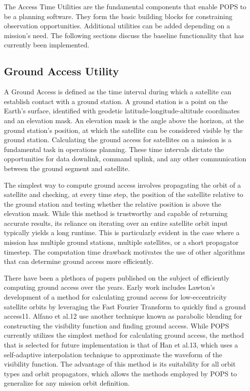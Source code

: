 The Access Time Utilities are the fundamental components that enable POPS to be
a planning software. They form the basic building blocks for constraining
observation opportunities. Additional utilities can be added depending on a
mission’s need. The following sections discuss the baseline functionality that
has currently been implemented.


\subsection{Ground Access Utility}

A Ground Access is defined as the time interval during which a satellite can
establish contact with a ground station. A ground station is a point on the
Earth’s surface, identified with geodetic latitude-longitude-altitude
coordinates and an elevation mask. An elevation mask is the angle above the
horizon, at the ground station’s position, at which the satellite can be
considered visible by the ground station. Calculating the ground access for
satellites on a mission is a fundamental task in operations planning. These
time intervals dictate the opportunities for data downlink, command uplink, and
any other communication between the ground segment and satellite. 

The simplest way to compute ground access involves propagating the orbit of a
satellite and checking, at every time step, the position of the satellite
relative to the ground station and testing whether the relative position is
above the elevation mask. While this method is trustworthy and capable of
returning accurate results, its reliance on iterating over an entire satellite
orbit input typically yields a long runtime. This is particularly evident in
the case where a mission has multiple ground stations, multiple satellites, or
a short propagator timestep. The computation time drawback motivates the use of
other algorithms that can determine ground access more efficiently. 

There have been a plethora of papers published on the subject of efficiently
computing ground access over the years. Early work includes Lawton’s
development of a method for calculating ground access for low-eccentricity
satellite orbits by leveraging the Fast Fourier Transform to quickly find a
ground access11. Alfano et al.12 use another technique known as parabolic
blending for constructing the visibility function and finding ground access.
While POPS currently utilizes the simplest method for calculating ground
access, the method that is selected for future implementation is that of Han et
al.13, which uses a self-adaptive interpolation technique to approximate the
waveform of the visibility function. The advantage of this method is its
suitability for all orbit types and orbit propagators, which allows the methods
employed by POPS to generalize for any mission orbit definition. 



